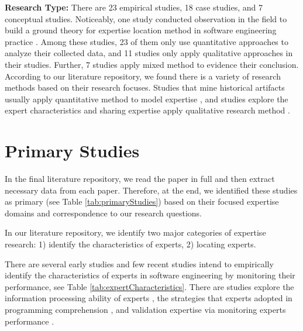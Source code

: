 \textbf{Research Type:} There are 23 empirical studies, 18 case studies, and 7 conceptual studies. Noticeably, one study conducted observation in the field to build a ground theory for expertise location method in software engineering practice \cite{mcdonald1998just}. Among these studies, 23 of them only use quantitative approaches to analyze their collected data, and 11 studies only apply qualitative approaches in their studies. Further, 7 studies apply mixed method to evidence their conclusion. According to our literature repository, we found there is a variety of research methods based on their research focuses. Studies that mine historical artifacts usually apply quantitative method to model expertise \cite{Anvik2006who, minto2007recommending, mockus2002expertise, vasilescu2014social}, and studies explore the expert characteristics and sharing expertise apply qualitative research method \cite{chen2016towards, koenemann1991expert, ley2014information, waterson1997dynamics}.

\section{Primary Studies}

In the final literature repository, we read the paper in full and then extract necessary data from each paper. Therefore, at the end, we identified these studies as primary (see Table \ref{tab:primaryStudies}) based on their focused expertise domains and correspondence to our research questions.



In our literature repository, we identify two major categories of expertise research: 1) identify the characteristics of experts, 2) locating experts.



There are several early studies and few recent studies intend to empirically identify the characteristics of experts in software engineering by monitoring their performance, see Table \ref{tab:expertCharacteristics}. There are studies explore the information processing ability of experts \cite{MCKEITHEN1981307}, the strategies that experts adopted in programming comprehension \cite{koenemann1991expert}, and validation expertise via monitoring experts performance \cite{davies1994knowledge, bergersen2014construction}.

